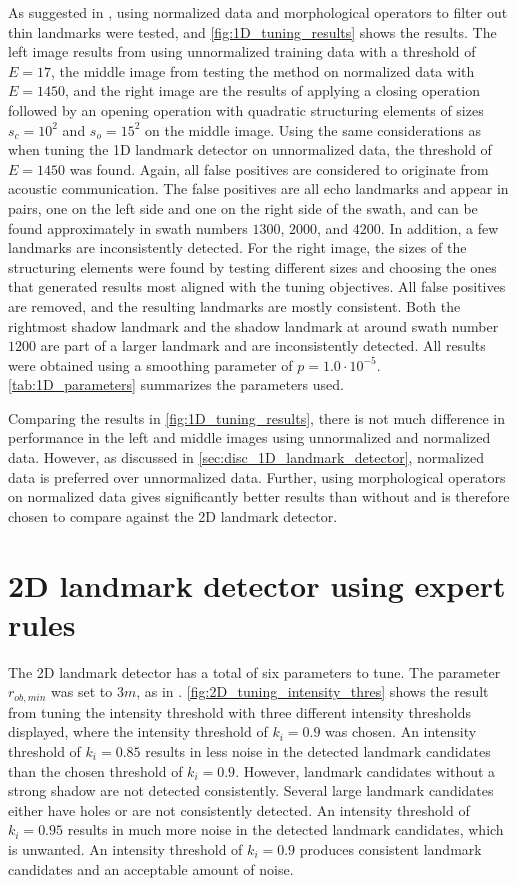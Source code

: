 As suggested in \cite{Al-Rawi2017LandmarkImages}, using normalized data and morphological operators to filter out thin landmarks were tested, and \cref{fig:1D_tuning_results} shows the results. The left image results from using unnormalized training data with a threshold of $E = 17$, the middle image from testing the method on normalized data with $E = 1450$, and the right image are the results of applying a closing operation followed by an opening operation with quadratic structuring elements of sizes $s_c = 10^2$ and $s_o = 15^2$ on the middle image. Using the same considerations as when tuning the 1D landmark detector on unnormalized data, the threshold of $E = 1450$ was found. Again, all false positives are considered to originate from acoustic communication. The false positives are all echo landmarks and appear in pairs, one on the left side and one on the right side of the swath, and can be found approximately in swath numbers $1300$, $2000$, and $4200$. In addition, a few landmarks are inconsistently detected. For the right image, the sizes of the structuring elements were found by testing different sizes and choosing the ones that generated results most aligned with the tuning objectives. All false positives are removed, and the resulting landmarks are mostly consistent. Both the rightmost shadow landmark and the shadow landmark at around swath number $1200$ are part of a larger landmark and are inconsistently detected. All results were obtained using a smoothing parameter of $p = 1.0 \cdot 10^{-5}$. \cref{tab:1D_parameters} summarizes the parameters used. 
 
Comparing the results in \cref{fig:1D_tuning_results}, there is not much difference in performance in the left and middle images using unnormalized and normalized data. However, as discussed in \cref{sec:disc_1D_landmark_detector}, normalized data is preferred over unnormalized data. Further, using morphological operators on normalized data gives significantly better results than without and is therefore chosen to compare against the 2D landmark detector.

\section{2D landmark detector using expert rules}

The 2D landmark detector has a total of six parameters to tune. The parameter $r_{ob, min}$ was set to $3 m $, as in \cite{Leblond2019SonarProject}. \cref{fig:2D_tuning_intensity_thres} shows the result from tuning the intensity threshold with three different intensity thresholds displayed, where the intensity threshold of $k_i = 0.9$ was chosen. An intensity threshold of $k_i = 0.85$ results in less noise in the detected landmark candidates than the chosen threshold of $k_i = 0.9$. However, landmark candidates without a strong shadow are not detected consistently. Several large landmark candidates either have holes or are not consistently detected. An intensity threshold of $k_i = 0.95$ results in much more noise in the detected landmark candidates, which is unwanted. An intensity threshold of $k_i = 0.9$ produces consistent landmark candidates and an acceptable amount of noise. 

